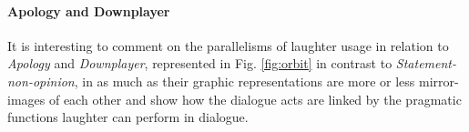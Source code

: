 \documentclass[11pt,a4paper]{article}
\begin{document}

\begin{lingex}
\item\label{ex:selftalk}
  \small

\item\label{ex:appropriate}
  \small
\end{lingex}










\paragraph{Apology and Downplayer}\label{subs:ap-down}
It is interesting to comment on the parallelisms of laughter usage
in relation to \textit{Apology} and \textit{Downplayer}, represented
in Fig. \ref{fig:orbit} in contrast to \emph{Statement-non-opinion}, in
as much as their graphic representations are more or less mirror-images of each other
 and show how the dialogue acts are 
linked by the pragmatic functions laughter can perform in dialogue.
\end{document}
